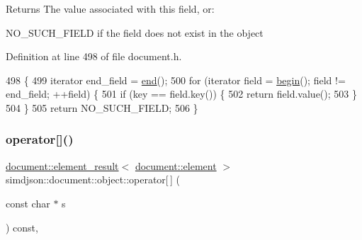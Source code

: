 \begin{DoxyReturn}{Returns}
The value associated with this field, or\+:
\begin{DoxyItemize}
\item N\+O\+\_\+\+S\+U\+C\+H\+\_\+\+F\+I\+E\+LD if the field does not exist in the object 
\end{DoxyItemize}
\end{DoxyReturn}


Definition at line 498 of file document.\+h.


\begin{DoxyCode}
498                                                                                                            
             \{
499   iterator end\_field = \hyperlink{classsimdjson_1_1document_1_1object_a38ab9979d9eecb0b70768dcde9d12864}{end}();
500   \textcolor{keywordflow}{for} (iterator field = \hyperlink{classsimdjson_1_1document_1_1object_a88e638207141099532b524a8814540e0}{begin}(); field != end\_field; ++field) \{
501     \textcolor{keywordflow}{if} (key == field.key()) \{
502       \textcolor{keywordflow}{return} field.value();
503     \}
504   \}
505   \textcolor{keywordflow}{return} NO\_SUCH\_FIELD;
506 \}
\end{DoxyCode}
\mbox{\label{classsimdjson_1_1document_1_1object_a57e850feb7121e097754e5e82a5de2a4}} 
\subsubsection{\texorpdfstring{operator[]()}{operator[]()}\hspace{0.1cm}{\footnotesize\ttfamily [2/2]}}
{\footnotesize\ttfamily \hyperlink{classsimdjson_1_1document_1_1element__result}{document\+::element\+\_\+result}$<$ \hyperlink{classsimdjson_1_1document_1_1element}{document\+::element} $>$ simdjson\+::document\+::object\+::operator\mbox{[}$\,$\mbox{]} (\begin{DoxyParamCaption}\item[{const char $\ast$}]{s }\end{DoxyParamCaption}) const\hspace{0.3cm}{\ttfamily [inline]}, {\ttfamily [noexcept]}}



